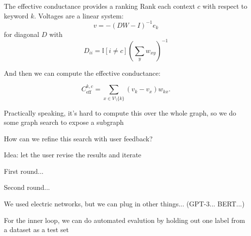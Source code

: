 \documentclass[12pt]{beamer}
\begin{document}
\begin{frame}{The effective conductance provides a ranking}
  Rank each context $c$ with respect to keyword $k$. Voltages are a linear system:
  \begin{equation}
    v = -(DW - I)^{-1} e_k
  \end{equation}
  for diagonal $D$ with
  $$D_{ii} = \mathbb{I}[i \ne c] \left(\sum_y w_{xy}\right)^{-1}$$

  And then we can compute the effective conductance:
  
  \begin{equation}
    C_{\textrm{eff}}^{k,c} = \sum_{x \in V \setminus \{k\}} (v_k - v_x) w_{kx}.
  \end{equation}
\end{frame}

\begin{frame}{}
  Practically speaking, it's hard to compute this over the whole graph, so we do some graph search to expose a subgraph
\end{frame}

\begin{frame}{}
  How can we refine this search with user feedback?
\end{frame}

\begin{frame}{}
  Idea: let the user revise the results and iterate
\end{frame}

\begin{frame}{}
  First round...
\end{frame}

\begin{frame}{}
  Second round...
\end{frame}

\begin{frame}{}
  We used electric networks, but we can plug in other things... (GPT-3... BERT...)
\end{frame}

\begin{frame}{}
  For the inner loop, we can do automated evalution by holding out one label from a dataset as a test set
\end{frame}
\end{document}
